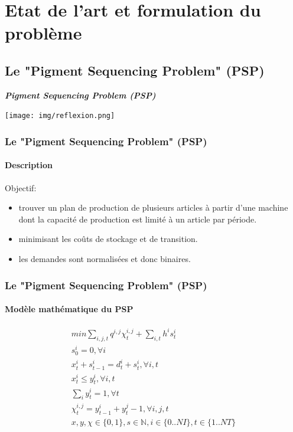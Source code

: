 \documentclass[11pt]{beamer}
\begin{document}
 \section{Etat de l'art et formulation du problème}
    
 \subsection{Le "Pigment Sequencing Problem" (PSP)}
 
 \begin{frame}
 	\begin{minipage}[c]{.46\linewidth}
      \Large{\emph{\textbf{Pigment Sequencing Problem (PSP) }}}
   \end{minipage} \hfill
   \begin{minipage}[c]{.46\linewidth}
		\texttt{[image: img/reflexion.png]}
   \end{minipage}
\end{frame}  
 
 \begin{frame}
 \frametitle{Le "Pigment Sequencing Problem" (PSP)}
 \framesubtitle{Description}
 
 	Objectif:
    \begin{itemize}
    	\item trouver un plan de production de plusieurs articles à partir d’une
machine dont la capacité de production est limité à un article par période.
		\vspace*{.5cm}
    	\item minimisant les coûts de stockage et de transition.
    	\vspace*{.5cm}
    	\item les demandes sont normalisées et donc binaires.
    \end{itemize}
 \end{frame} 
 
 \begin{frame}
 \frametitle{Le "Pigment Sequencing Problem" (PSP)}
 \framesubtitle{Modèle mathématique du PSP}
 	\begin{eqnarray}
		min \sum_{i,j,t} q^{i,j}\chi_{t}^{i,j} + \sum_{i,t} h^{i} s_{t}^{i} \\
		s_{0}^{i} = 0, \forall i \\
		x_{t}^{i} + s_{t-1}^{i} = d_{t}^{i} + s_{t}^{i}, \forall i,t \\
		x_{t}^{i} \leq y_{t}^{i}, \forall i,t \\
		\sum_{i} y_{t}^{i} = 1 , \forall t \\
		\chi_{t}^{i,j} = y_{t-1}^{i} + y_{t}^{j} - 1, \forall i,j,t \\
		x,y,\chi \in \{0,1\}, s \in \mathbb{N}, i \in \{0..NI\}, t \in \{1..NT\}
	\end{eqnarray}
 \end{frame} 
 
\end{document}
